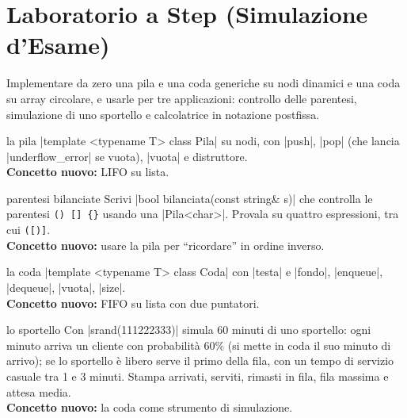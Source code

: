 \section{Laboratorio a Step (Simulazione d'Esame)}

\begin{traccia}
Implementare da zero una pila e una coda generiche su nodi dinamici e una coda su array
circolare, e usarle per tre applicazioni: controllo delle parentesi, simulazione di uno
sportello e calcolatrice in notazione postfissa.
\end{traccia}

\begin{step}{la pila}
\cc|template <typename T> class Pila| su nodi, con \cc|push|, \cc|pop| (che lancia
\cc|underflow_error| se vuota), \cc|vuota| e distruttore.\\[0.3em]
\textbf{Concetto nuovo:} LIFO su lista.
\end{step}

\begin{step}{parentesi bilanciate}
Scrivi \cc|bool bilanciata(const string& s)| che controlla le parentesi
\texttt{() [] \{\}} usando una \cc|Pila<char>|. Provala su quattro espressioni, tra cui
\texttt{([)]}.\\[0.3em]
\textbf{Concetto nuovo:} usare la pila per ``ricordare'' in ordine inverso.
\end{step}

\begin{step}{la coda}
\cc|template <typename T> class Coda| con \cc|testa| e \cc|fondo|, \cc|enqueue|,
\cc|dequeue|, \cc|vuota|, \cc|size|.\\[0.3em]
\textbf{Concetto nuovo:} FIFO su lista con due puntatori.
\end{step}

\begin{step}{lo sportello}
Con \cc|srand(111222333)| simula 60 minuti di uno sportello: ogni minuto arriva un
cliente con probabilità 60\% (si mette in coda il suo minuto di arrivo); se lo sportello
è libero serve il primo della fila, con un tempo di servizio casuale tra 1 e 3 minuti.
Stampa arrivati, serviti, rimasti in fila, fila massima e attesa media.\\[0.3em]
\textbf{Concetto nuovo:} la coda come strumento di simulazione.
\end{step}

